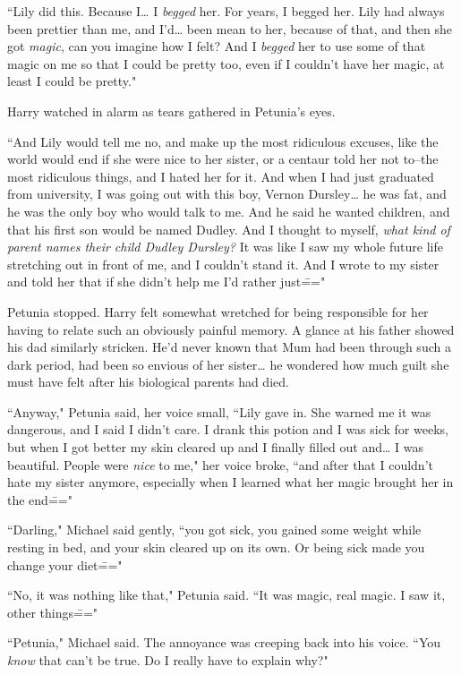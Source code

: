 ``Lily did this. Because I{\ldots} I \emph{begged} her. For years, I begged her. Lily had always been prettier than me, and I'd{\ldots} been mean to her, because of that, and then she got \emph{magic}, can you imagine how I felt? And I \emph{begged} her to use some of that magic on me so that I could be pretty too, even if I couldn't have her magic, at least I could be pretty."

Harry watched in alarm as tears gathered in Petunia's eyes.

``And Lily would tell me no, and make up the most ridiculous excuses, like the world would end if she were nice to her sister, or a centaur told her not to\---the most ridiculous things, and I hated her for it. And when I had just graduated from university, I was going out with this boy, Vernon Dursley{\ldots} he was fat, and he was the only boy who would talk to me. And he said he wanted children, and that his first son would be named Dudley. And I thought to myself, \emph{what kind of parent names their child Dudley Dursley?} It was like I saw my whole future life stretching out in front of me, and I couldn't stand it. And I wrote to my sister and told her that if she didn't help me I'd rather just\==="

Petunia stopped. Harry felt somewhat wretched for being responsible for her having to relate such an obviously painful memory. A glance at his father showed his dad similarly stricken. He'd never known that Mum had been through such a dark period, had been so envious of her sister{\ldots} he wondered how much guilt she must have felt after his biological parents had died.

``Anyway," Petunia said, her voice small, ``Lily gave in. She warned me it was dangerous, and I said I didn't care. I drank this potion and I was sick for weeks, but when I got better my skin cleared up and I finally filled out and{\ldots} I was beautiful. People were \emph{nice} to me," her voice broke, ``and after that I couldn't hate my sister anymore, especially when I learned what her magic brought her in the end\==="

``Darling," Michael said gently, ``you got sick, you gained some weight while resting in bed, and your skin cleared up on its own. Or being sick made you change your diet\==="

``No, it was nothing like that," Petunia said. ``It was magic, real magic. I saw it, other things\==="

``Petunia," Michael said. The annoyance was creeping back into his voice. ``You \emph{know} that can't be true. Do I really have to explain why?"


